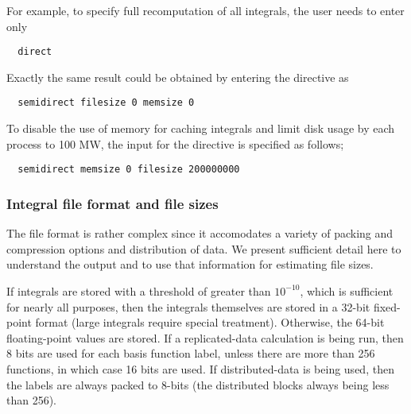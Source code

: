 For example, to specify full recomputation of all integrals, the user
needs to enter only

\begin{verbatim}
  direct
\end{verbatim}

Exactly the same result could be obtained by entering the directive as

\begin{verbatim}
  semidirect filesize 0 memsize 0
\end{verbatim}

To disable the use of memory for caching integrals and
limit disk usage by each process to 100 MW, the input for the directive is
specified as follows;

\begin{verbatim}
  semidirect memsize 0 filesize 200000000
\end{verbatim}






\subsubsection{Integral file format and file sizes}

The file format is rather complex since it accomodates a variety of
packing and compression options and distribution of data.  We present
sufficient detail here to understand the output and to use that
information for estimating file sizes.

If integrals are stored with a threshold of greater than $10^{-10}$,
which is sufficient for nearly all purposes, then the integrals
themselves are stored in a 32-bit fixed-point format (large integrals
require special treatment).  Otherwise, the 64-bit floating-point
values are stored.  If a replicated-data calculation is being run,
then 8 bits are used for each basis function label, unless there are
more than 256 functions, in which case 16 bits are used.  If
distributed-data is being used, then the labels are always packed to
8-bits (the distributed blocks always being less than 256).

